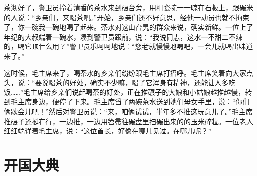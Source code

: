 \documentclass[12pt,UTF-8,openany]{ctexbook}
\begin{document}
\begin{large}
    茶沏好了，警卫员拎着清香的茶水来到碾台旁，用粗瓷碗一一晾在石板上，跟碾米的人说：“乡亲们，来喝茶吧。”开始，乡亲们还不好意思，经他一动员也就不拘束了，你一碗我一碗地喝了起来。茶水对这山旮旯的群众来说，确实新鲜。一位上了年纪的大叔端着一碗水，凑到警卫员跟前，说：“我说同志，这水一不甜二不辣的，喝它顶什么用？”警卫员乐呵呵地说：“您老就慢慢地喝吧，一会儿就喝出味道来了。”
    
    这时候，毛主席来了，喝茶水的乡亲们纷纷跟毛主席打招呼。毛主席笑着向大家点头，说：“要说喝茶的好处，确实不少嘛，喝了它浑身有精神，还能让人多吃饭……”毛主席给乡亲们说起喝茶的好处，正在推碾子的大娘和小姑娘越推越慢，转到毛主席身边，便停了下来。毛主席舀了两碗茶水送到她们母女手里，说：“你们俩歇会儿吧！”然后对警卫员说：“来，咱俩试试，半年多不推这玩意儿了。”毛主席推碾子还挺在行，一边推，一边用笤帚往碾盘里扫碾出来的的玉米碎粒。一位老人细细端详着毛主席，说：“这位首长，好像在哪儿见过。在哪儿呢？”
    
\end{large}



\chapter{开国大典}
\end{document}
